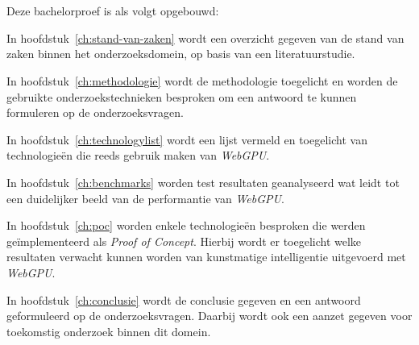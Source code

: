 \section{}%
\label{sec:opzet-bachelorproef}


Deze bachelorproef is als volgt opgebouwd:

\bigbreak{}

In hoofdstuk~\ref{ch:stand-van-zaken} wordt een overzicht gegeven van de stand van zaken binnen het onderzoeksdomein, op basis van een literatuurstudie.

\bigbreak{}

In hoofdstuk~\ref{ch:methodologie} wordt de methodologie toegelicht en worden de gebruikte onderzoekstechnieken besproken om een antwoord te kunnen formuleren op de onderzoeksvragen.

\bigbreak{}

In hoofdstuk~\ref{ch:technologylist} wordt een lijst vermeld en toegelicht van technologieën die reeds gebruik maken van \textit{WebGPU}.

\bigbreak{}

In hoofdstuk~\ref{ch:benchmarks} worden test resultaten geanalyseerd wat leidt tot een duidelijker beeld van de performantie van \textit{WebGPU}.

\bigbreak{}

In hoofdstuk~\ref{ch:poc} worden enkele technologieën besproken die werden geïmplementeerd als \textit{Proof of Concept}. Hierbij wordt er toegelicht welke resultaten verwacht kunnen worden van kunstmatige intelligentie uitgevoerd met \textit{WebGPU}.

\bigbreak{}

In hoofdstuk~\ref{ch:conclusie} wordt de conclusie gegeven en een antwoord geformuleerd op de onderzoeksvragen. Daarbij wordt ook een aanzet gegeven voor toekomstig onderzoek binnen dit domein.